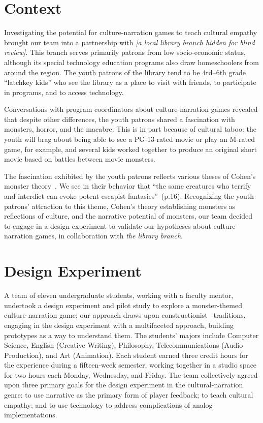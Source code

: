 \documentclass[a4paper]{article}
\begin{document}
\section{Context}

Investigating the potential for culture-narration games to teach
cultural empathy brought our team into a partnership with
\textit{[a local library branch hidden for blind review]}. This branch
serves primarily patrons from low socio-economic status, although
its special technology education programs also draw homeschoolers from
around the region.
The youth patrons of the library tend to be 4rd--6th grade 
``latchkey kids'' who 
see the library as a place to visit with friends, to participate in programs,
and to access technology.

Conversations with program coordinators about culture-narration games
revealed that despite other differences, the youth patrons shared
a fascination with monsters, horror, and the macabre. 
This is in part because of cultural taboo: the youth will brag about
being able to see a PG-13-rated movie or play an M-rated game,
for example, and several kids worked together to produce an original
short movie based on battles between movie monsters.

The fascination exhibited by the youth patrons reflects various theses
of Cohen's monster theory~\citep{Cohen1996}. 
We see in their behavior that ``the same creatures who terrify and
interdict can evoke potent escapist fantasies''~(p.16).
Recognizing the youth patrons' attraction to this theme,
Cohen's theory establishing monsters as reflections of culture,
and the narrative potential of monsters,
our team decided to engage in a design experiment to validate our
hypotheses about culture-narration games,
in collaboration with \textit{the library branch}.


\section{Design Experiment}

A team of eleven undergraduate students, working with a faculty mentor,
undertook a design experiment and pilot study to explore a monster-themed
culture-narration game;
our approach draws upon constructionist~\citep{Papert2001}
traditions, engaging in the design experiment with a multifaceted approach,
building prototypes as a way to understand them.
The students' majors include Computer Science, English
(Creative Writing), Philosophy, Telecommunications (Audio Production),
and Art (Animation).
Each student earned three credit hours for the experience during a fifteen-week
semester,
working together in a studio space for two hours each Monday, Wednesday,
and Friday.
The team collectively agreed upon three primary goals for the design
experiment in the cultural-narration genre:
to use narrative as the primary form of player feedback;
to teach cultural empathy;
and to use technology to address complications of analog implementations.
\end{document}
